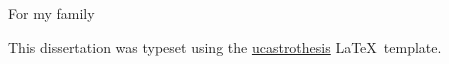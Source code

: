 \documentclass[12pt]{myucthesis}
\begin{document}
\hypersetup{pageanchor=true}
\begin{frontmatter}

\begin{dedication}
\null\vfil
{\large
\begin{center}
For my family
\end{center}}
\null\vfil
\end{dedication}

\tableofcontents
\listoffigures %
\listoftables %


\begin{acknowledgements}

This dissertation was typeset using the
\href{https://github.com/pkgw/ucastrothesis}{\textsf{ucastrothesis}}
\LaTeX\ template.

\end{acknowledgements}
\end{frontmatter}








\end{document}
